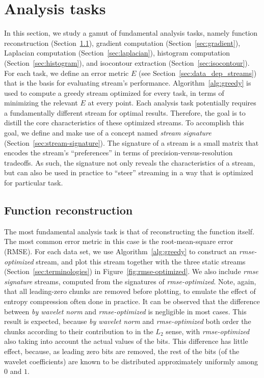\section{Analysis tasks}
\label{sec:analysis-tasks}

In this section, we study a gamut of fundamental analysis tasks, namely function reconstruction
(Section~\ref{sec:rmse-optimized}), gradient computation (Section~\ref{sec:gradient}), Laplacian
computation (Section~\ref{sec:laplacian}), histogram computation (Section~\ref{sec:histogram}), and
isocontour extraction (Section~\ref{sec:isocontour}). For each task, we define an error metric $E$
(see Section~\ref{sec:data_dep_streams}) that is the basis for evaluating stream's performance.
Algorithm~\ref{alg:greedy} is used to compute a greedy stream optimized for every task, in
terms of minimizing the relevant $E$ at every point. Each analysis task potentially requires a
fundamentally different stream for optimal results. Therefore, the goal is to distill the core
characteristics of these optimized streams. To accomplish this goal, we define and make use of a
concept named \emph{stream signature} (Section~\ref{sec:stream-signature}). The signature of a
stream is a small matrix that encodes the stream's ``preferences'' in terms of
precision-versus-resolution tradeoffs. As such, the signature not only reveals the characteristics
of a stream, but can also be used in practice to ``steer'' streaming in a way that is optimized for
particular task.

\subsection{Function reconstruction}
\label{sec:rmse-optimized}

The most fundamental analysis task is that of reconstructing the function itself. The most common
error metric in this case is the root-mean-square error (RMSE). For each data set, we use
Algorithm~\ref{alg:greedy} to construct an \emph{rmse-optimized} stream, and plot this stream
together with the three static streams (Section~\ref{sec:terminologies}) in
Figure~\ref{fig:rmse-optimized}. We also include \emph{rmse signature} streams, computed from the
signatures of \emph{rmse-optimized}. Note, again, that all leading-zero chunks are removed before
plotting, to emulate the effect of entropy compression often done in practice. It can be observed
that the difference between \emph{by wavelet norm} and \emph{rmse-optimized} is negligible in most
cases. This result is expected, because \emph{by wavelet norm} and \emph{rmse-optimized} both order
the chunks according to their contribution to in the $L_2$ sense, with \emph{rmse-optimized} also
taking into account the actual values of the bits. This difference has little effect, because, as
leading zero bits are removed, the rest of the bits (of the wavelet coefficients) are known to be
distributed approximately uniformly among $0$ and $1$.

